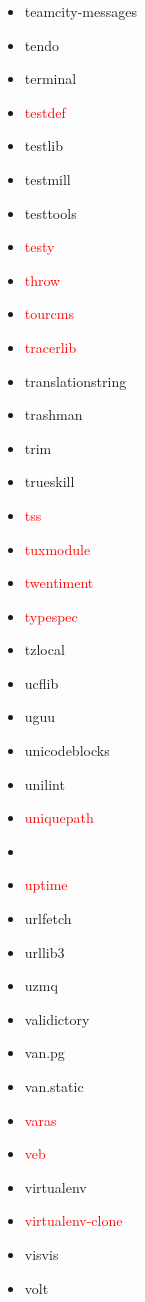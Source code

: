 \documentclass{l4proj}
\begin{document}
\begin{appendices}
{\begin{itemize}
\item teamcity-messages
\item tendo
\item terminal
\item\textcolor{red}{testdef}
\item testlib
\item testmill
\item testtools
\item\textcolor{red}{testy}
\item\textcolor{red}{throw}
\item\textcolor{red}{tourcms}
\end{itemize}
}%
\clearpage
\noindent\parbox[t]{0.32\textwidth}{\raggedright%
\begin{itemize}
\item\textcolor{red}{tracerlib}
\item translationstring
\item trashman
\item trim
\item trueskill
\item\textcolor{red}{tss}
\item\textcolor{red}{tuxmodule}
\item\textcolor{red}{twentiment}
\item\textcolor{red}{typespec}
\item tzlocal
\item ucflib
\item uguu
\item unicodeblocks
\item unilint
\item\textcolor{red}{uniquepath}
\item {}
\item\textcolor{red}{uptime}
\item urlfetch
\item urllib3
\item uzmq
\item validictory
\item van.pg
\item van.static
\item\textcolor{red}{varas}
\item\textcolor{red}{veb}
\item virtualenv
\item\textcolor{red}{virtualenv-clone}
\item visvis
\item volt
\end{itemize}
}
\end{appendices}
\end{document}
